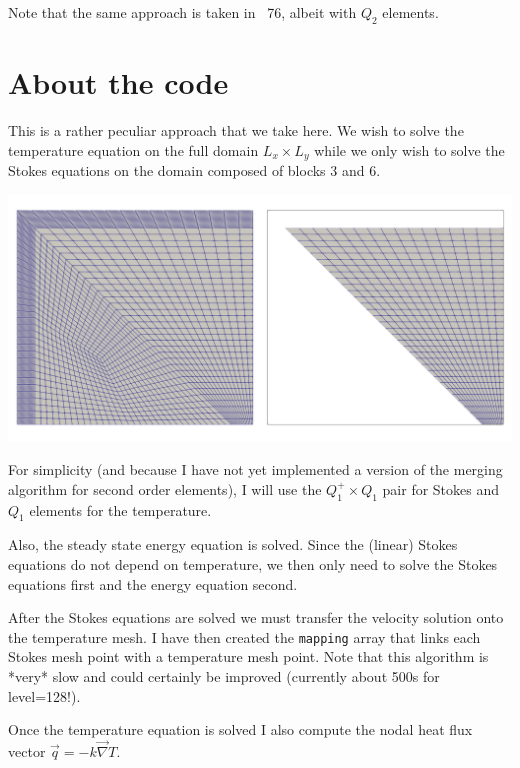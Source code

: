 Note that the same approach is taken in \stone~76, albeit with $Q_2$ elements.

\section*{About the code}

This is a rather peculiar approach that we take here. We wish to solve the 
temperature equation on the full domain $L_x \times L_y$ while 
we only wish to solve the Stokes equations on the domain composed of 
blocks 3 and 6. 

\begin{center}
\includegraphics[width=14cm]{python_codes/fieldstone_149/results/meshing/meshes}
\end{center}


For simplicity (and because I have not yet implemented a version of the 
merging algorithm for second order elements), I will use 
the $Q_1^+\times Q_1$ pair for Stokes and $Q_1$ elements for the temperature.

Also, the steady state energy equation is solved. Since the (linear) Stokes equations 
do not depend on temperature, we then only need to solve the Stokes equations 
first and the energy equation second.

After the Stokes equations are solved we must transfer the velocity solution 
onto the temperature mesh. I have then created the {\tt mapping} array
that links each Stokes mesh point with a temperature mesh point.
Note that this algorithm is *very* slow and could certainly be improved
(currently about 500s for level=128!). 

Once the temperature equation is solved I also compute the nodal heat flux vector
$\vec{q}=-k \vec\nabla T$.

\newpage
